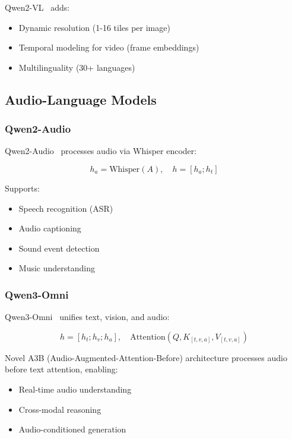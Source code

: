 Qwen2-VL~\citep{wang2024qwen2vl} adds:
\begin{itemize}
\item Dynamic resolution (1-16 tiles per image)
\item Temporal modeling for video (frame embeddings)
\item Multilinguality (30+ languages)
\end{itemize}

\subsection{Audio-Language Models}

\subsubsection{Qwen2-Audio}

Qwen2-Audio~\citep{chu2024qwen2audio} processes audio via Whisper encoder:

\begin{equation}
h_a = \text{Whisper}(A), \quad h = [h_a; h_t]
\end{equation}

Supports:
\begin{itemize}
\item Speech recognition (ASR)
\item Audio captioning
\item Sound event detection
\item Music understanding
\end{itemize}

\subsubsection{Qwen3-Omni}

Qwen3-Omni~\citep{qwen2025qwen3} unifies text, vision, and audio:

\begin{equation}
h = [h_t; h_v; h_a], \quad \text{Attention}(Q, K_{[t,v,a]}, V_{[t,v,a]})
\end{equation}

Novel A3B (Audio-Augmented-Attention-Before) architecture processes audio before text attention, enabling:
\begin{itemize}
\item Real-time audio understanding
\item Cross-modal reasoning
\item Audio-conditioned generation
\end{itemize}

